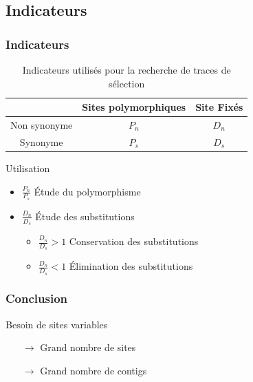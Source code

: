 \subsection{Indicateurs}
\begin{frame}
    \frametitle{Indicateurs}
    
    \begin{table}
        \centering
        \small
        \begin{tabular}{c c c}
           
            \toprule
              & Sites polymorphiques  & Site Fixés\\
            \midrule
            Non synonyme& $P_n$ & $D_n$  \\
            Synonyme & $P_s$ & $D_s$  \\

            \bottomrule
           
        \end{tabular}
         \caption{Indicateurs utilisés pour la recherche de traces de sélection}
    \end{table}

    \begin{exampleblock}{Utilisation}
        \begin{itemize}
            \item  $\frac{P_n}{P_s}$ Étude du polymorphisme 
            \item  $\frac{D_n}{D_s}$ Étude des substitutions
            \begin{itemize}
                \item $\frac{D_n}{D_s} > 1$ Conservation des substitutions
                \item $\frac{D_n}{D_s} < 1$ Élimination des substitutions
            \end{itemize}

        \end{itemize}
    \end{exampleblock}

    
\end{frame}

\begin{frame}
    \frametitle{Conclusion}
     \begin{alertblock}{Besoin de sites variables}
        \begin{itemize}
            \item[$\rightarrow$] Grand nombre de sites
            \item[$\rightarrow$] Grand nombre de contigs
        \end{itemize}
    \end{alertblock}
    
\end{frame}

